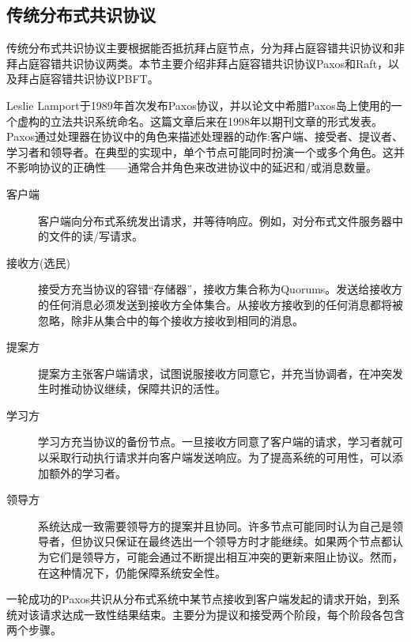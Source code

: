 \subsection{传统分布式共识协议}
\label{subsec:traditional-consensus}

传统分布式共识协议主要根据能否抵抗拜占庭节点，分为拜占庭容错共识协议和非拜占庭容错共识协议两类。本节主要介绍非拜占庭容错共识协议Paxos和Raft，以及拜占庭容错共识协议PBFT。

Leslie Lamport于1989年首次发布Paxos协议，并以论文中希腊Paxos岛上使用的一个虚构的立法共识系统命名。这篇文章后来在1998年以期刊文章的形式发表。Paxos通过处理器在协议中的角色来描述处理器的动作:客户端、接受者、提议者、学习者和领导者。在典型的实现中，单个节点可能同时扮演一个或多个角色。这并不影响协议的正确性——通常合并角色来改进协议中的延迟和/或消息数量。

\begin{description}
  \item[客户端] 客户端向分布式系统发出请求，并等待响应。例如，对分布式文件服务器中的文件的读/写请求。
  \item[接收方(选民)] 接受方充当协议的容错“存储器”，接收方集合称为Quorums。发送给接收方的任何消息必须发送到接收方全体集合。从接收方接收到的任何消息都将被忽略，除非从集合中的每个接收方接收到相同的消息。
  \item[提案方] 提案方主张客户端请求，试图说服接收方同意它，并充当协调者，在冲突发生时推动协议继续，保障共识的活性。
  \item[学习方] 学习方充当协议的备份节点。一旦接收方同意了客户端的请求，学习者就可以采取行动执行请求并向客户端发送响应。为了提高系统的可用性，可以添加额外的学习者。
  \item[领导方] 系统达成一致需要领导方的提案并且协同。许多节点可能同时认为自己是领导者，但协议只保证在最终选出一个领导方时才能继续。如果两个节点都认为它们是领导方，可能会通过不断提出相互冲突的更新来阻止协议。然而，在这种情况下，仍能保障系统安全性。
\end{description}

一轮成功的Paxos共识从分布式系统中某节点接收到客户端发起的请求开始，到系统对该请求达成一致性结果结束。主要分为提议和接受两个阶段，每个阶段各包含两个步骤。

